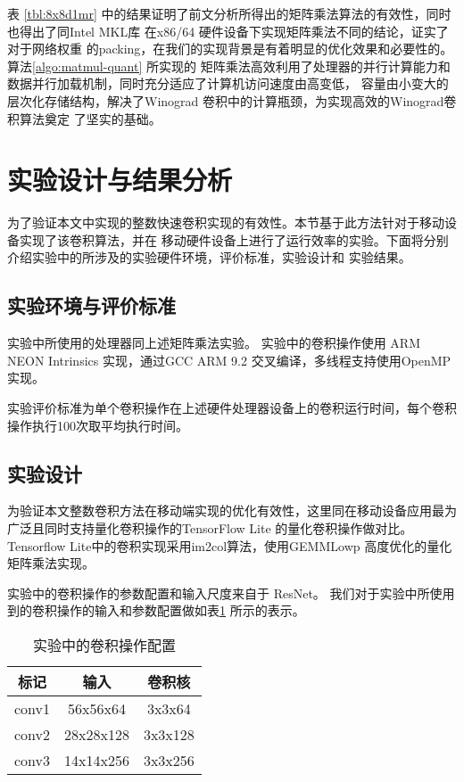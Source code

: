 表 \ref{tbl:8x8d1mr} 中的结果证明了前文分析所得出的矩阵乘法算法的有效性，同时也得出了同Intel MKL库
在x86/64 硬件设备下实现矩阵乘法\cite{mkl_gemm_pack}不同的结论，证实了对于网络权重
的packing，在我们的实现背景是有着明显的优化效果和必要性的。算法\ref{algo:matmul-quant} 所实现的
矩阵乘法高效利用了处理器的并行计算能力和数据并行加载机制，同时充分适应了计算机访问速度由高变低，
容量由小变大的层次化存储结构，解决了Winograd 卷积中的计算瓶颈，为实现高效的Winograd卷积算法奠定
了坚实的基础。

\section{实验设计与结果分析}

为了验证本文中实现的整数快速卷积实现的有效性。本节基于此方法针对于移动设备实现了该卷积算法，并在
移动硬件设备上进行了运行效率的实验。下面将分别介绍实验中的所涉及的实验硬件环境，评价标准，实验设计和
实验结果。

\subsection{实验环境与评价标准}

实验中所使用的处理器同上述矩阵乘法实验。 
实验中的卷积操作使用 ARM NEON Intrinsics 实现，通过GCC ARM 9.2 交叉编译，多线程支持使用OpenMP实现。

实验评价标准为单个卷积操作在上述硬件处理器设备上的卷积运行时间，每个卷积操作执行100次取平均执行时间。

\subsection{实验设计}

为验证本文整数卷积方法在移动端实现的优化有效性，这里同在移动设备应用最为广泛且同时支持量化卷积操作的TensorFlow Lite 的量化卷积操作做对比。Tensorflow Lite中的卷积实现采用im2col算法，使用GEMMLowp 高度优化的量化矩阵乘法实现。

实验中的卷积操作的参数配置和输入尺度来自于 ResNet\cite{He2016DeepRL}。
我们对于实验中所使用到的卷积操作的输入和参数配置做如表\ref{tbl:conv_repr} 所示的表示。

\begin{table}[]
\centering
\caption{实验中的卷积操作配置}
\begin{tabular}{ccc}
  \toprule
  标记    & 输入     & 卷积核  \\
  \midrule
  conv1   & 56x56x64  & 3x3x64  \\
  conv2   & 28x28x128 & 3x3x128 \\
  conv3   & 14x14x256 & 3x3x256 \\
  \bottomrule
\end{tabular}
\label{tbl:conv_repr}
\end{table}


